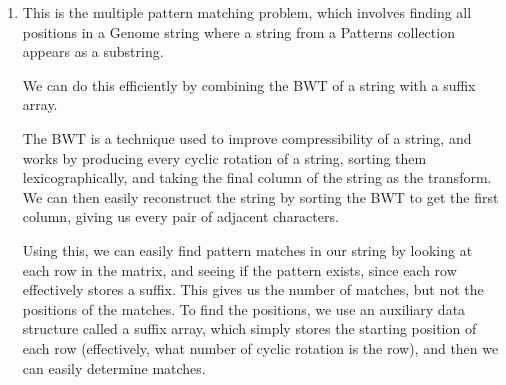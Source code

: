 \begin{enumerate}[label=(\alph*)]
  \item
    This is the multiple pattern matching problem, which involves finding all positions in a Genome string where a string from a Patterns collection appears as a substring.

    We can do this efficiently by combining the BWT of a string with a suffix array.

    The BWT is a technique used to improve compressibility of a string, and works by producing every cyclic rotation of a string, sorting them lexicographically, and taking the final column of the string as the transform. We can then easily reconstruct the string by sorting the BWT to get the first column, giving us every pair of adjacent characters.

    Using this, we can easily find pattern matches in our string by looking at each row in the matrix, and seeing if the pattern exists, since each row effectively stores a suffix. This gives us the number of matches, but not the positions of the matches. To find the positions, we use an auxiliary data structure called a suffix array, which simply stores the starting position of each row (effectively, what number of cyclic rotation is the row), and then we can easily determine matches.

    \end{enumerate}

